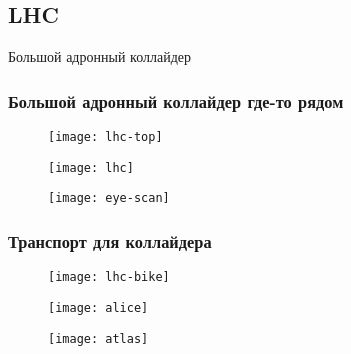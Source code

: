 \subsection{LHC}
\begin{frame}
    {\LARGE Большой адронный коллайдер}
\end{frame}
\begin{frame}
    \frametitle{Большой адронный коллайдер где-то рядом}
    \begin{figure}
        \begin{centering}
            \texttt{[image: lhc-top]}
        \end{centering}
    \end{figure}
\end{frame}
\begin{frame}
    \begin{figure}
        \begin{centering}
            \texttt{[image: lhc]}
        \end{centering}
    \end{figure}
\end{frame}
\begin{frame}
    \begin{figure}
        \begin{centering}
            \texttt{[image: eye-scan]}
        \end{centering}
    \end{figure}
\end{frame}
\begin{frame}
    \frametitle{Транспорт для коллайдера}
    \begin{figure}
        \begin{centering}
            \texttt{[image: lhc-bike]}
        \end{centering}
    \end{figure}
\end{frame}
\begin{frame}
    \begin{figure}
        \begin{centering}
            \texttt{[image: alice]}
        \end{centering}
    \end{figure}
\end{frame}
\begin{frame}
    \begin{figure}
        \begin{centering}
            \texttt{[image: atlas]}
        \end{centering}
    \end{figure}
\end{frame}

